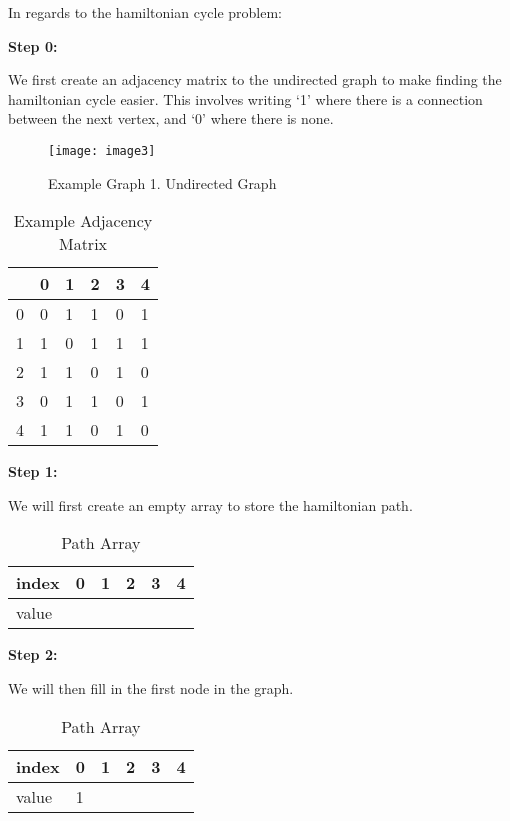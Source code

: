 In regards to the hamiltonian cycle problem:

\textbf{Step 0:}

We first create an adjacency matrix to the undirected graph to make finding the
hamiltonian cycle easier. This involves writing ‘1’ where there is a connection
between the next vertex, and ‘0’ where there is none.

\begin{figure}[h]
    \centering
    \texttt{[image: image3]}
    \caption{Example Graph 1. Undirected Graph}
    \label{fig:a}
\end{figure}

\begin{table}[h]
    \centering
    \caption{Example Adjacency Matrix}
    \begin{tabular}{l | lllll}
          & 0 & 1 & 2 & 3 & 4  \\
        \hline
        0 & 0 & 1 & 1 & 0 & 1  \\
        1 & 1 & 0 & 1 & 1 & 1  \\
        2 & 1 & 1 & 0 & 1 & 0  \\
        3 & 0 & 1 & 1 & 0 & 1  \\
        4 & 1 & 1 & 0 & 1 & 0 
    \end{tabular}
\end{table}

\textbf{Step 1:}

We will first create an empty array to store the hamiltonian path.

\begin{table}[H]
    \centering
    \caption{Path Array}
    \begin{tabular}{l | lllll}
        index & 0 & 1 & 2 & 3 & 4  \\
        \hline
        value &   &   &   &   &    \\
    \end{tabular}
\end{table}

\textbf{Step 2:}

We will then fill in the first node in the graph.

\begin{table}[H]
    \centering
    \caption{Path Array}
    \begin{tabular}{l | lllll}
        index & 0 & 1 & 2 & 3 & 4  \\
        \hline
        value & 1 &   &   &   &    \\
    \end{tabular}
\end{table}

